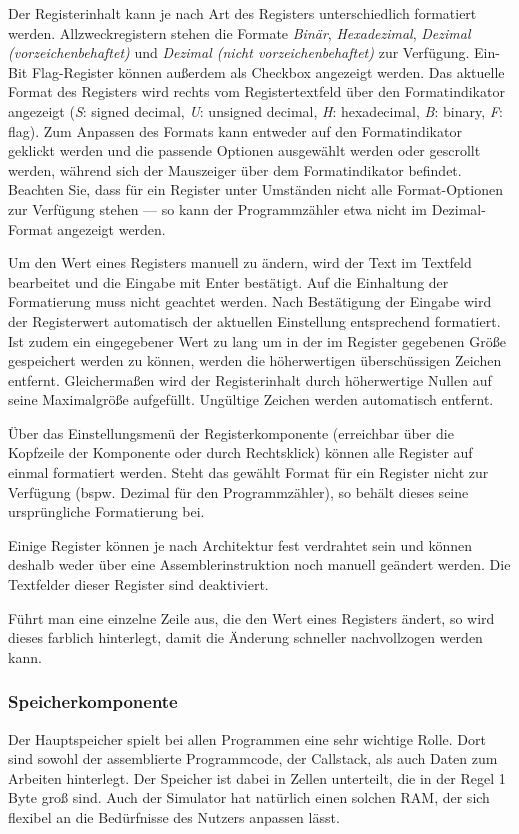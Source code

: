 Der Registerinhalt kann je nach Art des Registers unterschiedlich formatiert
werden. Allzweckregistern stehen die Formate \textit{Binär},
\textit{Hexadezimal}, \textit{Dezimal (vorzeichenbehaftet)} und \textit{Dezimal
(nicht vorzeichenbehaftet)} zur Verfügung. Ein-Bit Flag-Register können außerdem
als Checkbox angezeigt werden. Das aktuelle Format des Registers wird rechts vom
Registertextfeld über den Formatindikator angezeigt (\textit{S}: signed decimal,
\textit{U}: unsigned decimal, \textit{H}: hexadecimal, \textit{B}: binary,
\textit{F}: flag). Zum Anpassen des Formats kann entweder auf den
Formatindikator geklickt werden und die passende Optionen ausgewählt werden oder
gescrollt werden, während sich der Mauszeiger über dem Formatindikator befindet.
Beachten Sie, dass für ein Register unter Umständen nicht alle Format-Optionen
zur Verfügung stehen --- so kann der Programmzähler etwa nicht im Dezimal-Format
angezeigt werden.

Um den Wert eines Registers manuell zu ändern, wird der Text im Textfeld
bearbeitet und die Eingabe mit Enter bestätigt. Auf die Einhaltung der
Formatierung muss nicht geachtet werden. Nach Bestätigung der Eingabe wird der
Registerwert automatisch der aktuellen Einstellung entsprechend formatiert. Ist
zudem ein eingegebener Wert zu lang um in der im Register gegebenen Größe gespeichert
werden zu können, werden die höherwertigen überschüssigen Zeichen entfernt.
Gleichermaßen wird der Registerinhalt durch höherwertige Nullen auf seine
Maximalgröße aufgefüllt. Ungültige Zeichen werden automatisch entfernt.

Über das Einstellungsmenü der Registerkomponente (erreichbar über die Kopfzeile
der Komponente oder durch Rechtsklick) können alle Register auf einmal
formatiert werden. Steht das gewählt Format für ein Register nicht zur Verfügung
(bspw. Dezimal für den Programmzähler), so behält dieses seine ursprüngliche
Formatierung bei.

Einige Register können je nach Architektur fest verdrahtet sein und können
deshalb weder über eine Assemblerinstruktion noch manuell geändert werden. Die
Textfelder dieser Register sind deaktiviert.

Führt man eine einzelne Zeile aus, die den Wert eines Registers ändert, so wird
dieses farblich hinterlegt, damit die Änderung schneller nachvollzogen werden
kann.


\subsubsection{Speicherkomponente}
Der Hauptspeicher spielt bei allen Programmen eine sehr wichtige Rolle. Dort
sind sowohl der assemblierte Programmcode, der Callstack, als auch Daten zum
Arbeiten hinterlegt. Der Speicher ist dabei in Zellen unterteilt, die in der
Regel 1 Byte groß sind. Auch der Simulator hat natürlich einen solchen RAM, der
sich flexibel an die Bedürfnisse des Nutzers anpassen lässt.

